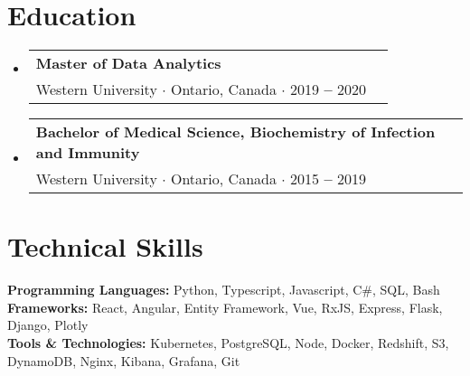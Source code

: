 \documentclass[letterpaper,10pt]{article}
\makeatletter
\newcommand{\resumeEducationHeading}[4]{
  \vspace{-2pt}\item
    \begin{tabular*}{0.97\textwidth}[t]{l@{\extracolsep{\fill}}r}
      \textbf{#1}\\
      \quad \small#3 $\cdot$ \small #4 $\cdot$ #2\\
    \end{tabular*}\vspace{-5pt}
}
\newcommand{\resumeOrganizationHeading}[4]{
  \vspace{-2pt}\item
    \begin{tabular*}{0.97\textwidth}[t]{l@{\extracolsep{\fill}}r}
      \textbf{#1} & \textit{\small #2} \\
      \textit{\small#3}
    \end{tabular*}\vspace{-7pt}
}
\newcommand{\resumeSubHeadingListStart}{\begin{itemize}[leftmargin=0.15in, label={}]}
\newcommand{\resumeSubHeadingListEnd}{\end{itemize}}
\makeatother
\begin{document}


\section{Education}
  \vspace{3pt}
  \resumeSubHeadingListStart
    
    \resumeEducationHeading
      {Master of Data Analytics}{2019 \textbf{--} 2020}
      {Western University}{Ontario, Canada}

    \resumeEducationHeading
      {Bachelor of Medical Science, Biochemistry of Infection and Immunity}{2015 \textbf{--} 2019}
      {Western University}{Ontario, Canada}

    \resumeSubHeadingListEnd



\section{Technical Skills}
  \vspace{2pt}
  \resumeSubHeadingListStart
    \small{\item{
        \textbf{Programming Languages:}{ Python, Typescript, Javascript, C\#, SQL, Bash } \\ \vspace{3pt}
        \textbf{Frameworks:}{ React, Angular, Entity Framework, Vue, RxJS, Express, Flask, Django, Plotly } \\ \vspace{3pt}
        \textbf{Tools \& Technologies:}{ Kubernetes, PostgreSQL, Node, Docker, Redshift, S3, DynamoDB, Nginx, Kibana, Grafana, Git } \\
    }}
  \resumeSubHeadingListEnd



    
    

\end{document}
